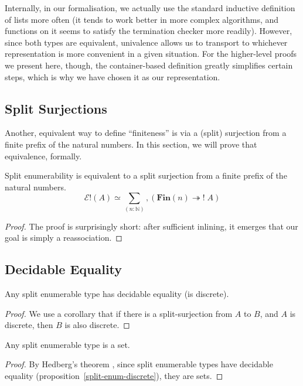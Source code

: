 Internally, in our formalisation, we actually use the standard
inductive definition of lists more often (it tends to work better in more
complex algorithms, and functions on it seems to satisfy the termination
checker more readily).
However, since both types are equivalent, univalence allows us to transport to
whichever representation is more convenient in a given situation.
For the higher-level proofs we present here, though, the container-based
definition greatly simplifies certain steps, which is why we have chosen it as
our representation.
\subsection{Split Surjections}
Another, equivalent way to define ``finiteness'' is via a (split) surjection
from a finite prefix of the natural numbers.
In this section, we will prove that equivalence, formally.

\begin{rm-theorem} \label{split-enum-surj}
  Split enumerability is equivalent to a split surjection from a finite prefix
  of the natural numbers.
  \begin{equation}
    \mathcal{E}!(A) \simeq \sum_{(n : \mathbb{N})} , \left( \mathbf{Fin}(n) \twoheadrightarrow ! \; A \right)
  \end{equation}
\end{rm-theorem}
\begin{proof}
  The proof is surprisingly short: after sufficient inlining, it emerges that
  our goal is simply a reassociation.
\end{proof}
\subsection{Decidable Equality}
\begin{rm-lemma} \label{split-enum-discrete}
  Any split enumerable type has decidable equality (is discrete).
\end{rm-lemma}
\begin{proof}
  We use a corollary that if there is a split-surjection from \(A\) to \(B\),
  and \(A\) is discrete, then \(B\) is also discrete.
\end{proof}
\begin{rm-lemma}
  Any split enumerable type is a set.
\end{rm-lemma}
\begin{proof}
  By Hedberg's theorem \cite{hedbergCoherenceTheoremMartinLof1998}, since split
  enumerable types have decidable equality
  (proposition~\ref{split-enum-discrete}), they are sets.
\end{proof}
